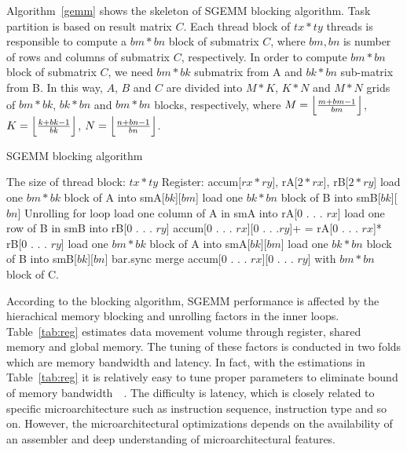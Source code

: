 \documentclass{sig-alternate-05-2015}
\begin{document}
Algorithm~\ref{gemm} shows the skeleton of SGEMM blocking algorithm. Task partition is based on result matrix $C$.
Each thread block of $tx*ty$ threads is responsible to compute a $bm*bn$ block of submatrix $C$,
where $bm, bn$ is number of rows and columns of submatrix $C$, respectively.
In order to compute $bm*bn$ block of submatrix $C$, we need $bm*bk$ submatrix from A and $bk*bn$
sub-matrix from B.
In this way, $A$, $B$ and $C$ are divided into $M*K$, $K*N$ and $M*N$ grids of $bm*bk$, $bk*bn$ and $bm*bn$ blocks, respectively, where
$M=\Bigl\lfloor \frac{m+bm-1}{bm} \Bigr\rfloor$,
$K=\Bigl\lfloor \frac{k+bk-1}{bk} \Bigr\rfloor$,
$N=\Bigl\lfloor \frac{n+bn-1}{bn} \Bigr\rfloor$.

\begin{algorithm}
      \caption{SGEMM blocking algorithm}\label{gemm}
  \begin{algorithmic}[1]
      \State The size of thread block: $tx*ty$
      \State Register: accum[$rx*ry$], rA[$2*rx$], rB[$2*ry$]
      \State load one $bm*bk$ block of A into smA[$bk$][$bm$]
      \State load one $bk*bn$ block of B into smB[$bk$][$bn$]
      \Do
       \Comment Unrolling for loop
      \State load one column of A in smA into rA[0 . . . $rx$]
      \State load one row of B in smB into rB[0 . . . $ry$]
      \State accum[0 . . . $rx$][0 . . .$ry$]+ = rA[0 . . . $rx$]* rB[0 . . . $ry$]
      \EndFor
      \State load one $bm*bk$ block of A into smA[$bk$][$bm$]
      \State load one $bk*bn$ block of B into smB[$bk$][$bn$]
      \State bar.sync
      \State merge accum[0 . . . $rx$][0 . . . $ry$] with $bm*bn$ block of C.
  \end{algorithmic}
\end{algorithm}

According to the blocking algorithm, SGEMM performance is affected by the hierachical memory blocking and unrolling factors in the inner loops. Table~\ref{tab:reg} estimates data movement volume through register, shared memory and global memory. The tuning of these factors is conducted in two folds which are memory bandwidth and latency. In fact, with the estimations in Table~\ref{tab:reg} it is relatively easy to tune proper parameters to eliminate bound of memory bandwidth~\cite{magma}~\cite{tan}. The difficulty is latency, which is closely related to specific microarchitecture such as instruction sequence, instruction type and so on. However, the microarchitectural optimizations depends on the availability of an assembler and deep understanding of microarchitectural features.
\end{document}
